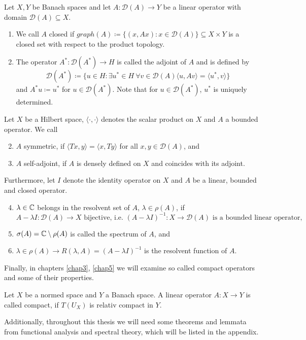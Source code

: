 \begin{definitions}
Let $X, Y$ be Banach spaces and let $A \colon \mathcal{D}(A) \rightarrow Y$ be a linear operator with domain $\mathcal{D}(A) \subseteq X$. 
\begin{enumerate}[label=\alph*\upshape)]
	\item We call $A$ closed if $graph(A) \coloneqq \{ (x, Ax) : x \in \mathcal{D}(A) \} \subseteq X \times Y$ is a closed set with respect to the product topology.
	\item The operator $A^{*} : \mathcal{D}(A^{*}) \rightarrow H $ is called the adjoint of $A$ and is defined by
		\[ \mathcal{D}(A^{*}) \coloneqq \{ u \in H : \exists u^{*} \in H ~\forall v \in \mathcal{D}(A) \langle u, A v \rangle = \langle u^{*} , v \rangle \} \]
		and $A^{*} u \coloneqq u^{*}$ for $u \in \mathcal{D}(A^{*})$. Note that for $u \in \mathcal{D}(A^{*})$, $u^{*}$ is uniquely determined. 
\end{enumerate}
Let $X$ be a Hilbert space, $\langle \cdot, \cdot \rangle$ denotes the scalar product on $X$ and $A$ a bounded operator. We call
\begin{enumerate}[label=\alph*\upshape)]  \setcounter{enumi}{1}
	\item $A$ symmetric, if $\langle Tx,y \rangle = \langle x ,Ty \rangle$ for all $x,y \in \mathcal{D}(A)$, and
	\item $A$ self-adjoint, if $A$ is densely defined on $X$ and coincides with its adjoint.
\end{enumerate}
Furthermore, let $I$ denote the identity operator on $X$ and $A$ be a linear, bounded and closed operator.
	\begin{enumerate}[label=\alph*\upshape)] \setcounter{enumi}{3}
		\item $\lambda \in \mathbb{C}$ belongs in the resolvent set of $A$, $\lambda \in \rho(A)$, if
			\[  A  - \lambda I \colon \mathcal{D}(A) \rightarrow X \text{ bijective, i.e. } (A - \lambda I)^{-1} \colon X \rightarrow \mathcal{D}(A) \text{ is a bounded linear operator,} \]
		\item $\sigma(A) = \mathbb{C} \setminus \rho(A)$ is called the spectrum of $A$, and
		\item $\lambda \in \rho(A) \rightarrow R(\lambda, A) = (A - \lambda I)^{-1}$ is the resolvent function of $A$.
	\end{enumerate}		
\end{definitions}

Finally, in chapters \ref{chap3}, \ref{chap5} we will examine so called compact operators and some of their properties.

\begin{definition}
	Let $X$ be a normed space and $Y$ a Banach space. A linear operator $A \colon X \rightarrow Y$ is called compact, if $T(U_{X})$ is relativ compact in $Y$.
\end{definition}

Additionally, throughout this thesis we will need some theorems and lemmata from functional analysis and spectral theory, which will be listed in the appendix.